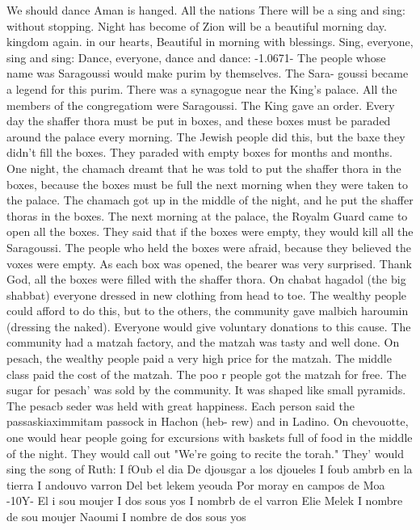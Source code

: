 {{We should dance 
Aman is hanged.
All the nations 
There will be a 
sing and sing: 
without stopping.
Night has become 
of Zion will be a 
beautiful morning 
day.
kingdom again.
in our hearts, 
Beautiful in morning with blessings.
Sing, everyone, sing and sing: 
Dance, everyone, dance and dance: 
-1.0671- 
The people whose name was Saragoussi would make purim by themselves.
The Sara-
goussi became a legend for this purim.
There was a synagogue near the King's palace.
All the members of the congregatiom were Saragoussi.
The King gave an order.
Every 
day the shaffer thora must be put in boxes, and these boxes must be paraded around the 
palace every morning.
The Jewish people did this, but the baxe they didn't fill the 
boxes.
They paraded with empty boxes for months and months.
One night, the chamach dreamt 
that he was told to put the shaffer thora in the boxes, because the boxes must be full 
the next morning when they were taken to the palace.
The chamach got up in the middle of 
the night, and he put the shaffer thoras in the boxes.
The next morning at the palace, the Royalm Guard came to open all the boxes.
They 
said that if the boxes were empty, they would kill all the Saragoussi.
The people who 
held the boxes were afraid, because they believed the voxes were empty.
As each box 
was opened, the bearer was very surprised.
Thank God, all the boxes were filled with the 
shaffer thora.
On chabat hagadol (the big shabbat) everyone dressed in new clothing from head to 
toe.
The wealthy people could afford to do this, but to the others, the community gave 
malbich haroumin (dressing the naked).
Everyone would give voluntary donations to this 
cause.
The community had a matzah factory, and the matzah was tasty and well done.
On 
pesach, the wealthy people paid a very high price for the matzah.
The middle class paid 
the cost of the matzah.
The poo r people got the matzah for free.
The sugar for pesach' 
was sold by the community.
It was shaped like small pyramids.
The pesacb seder was 
held with great happiness.
Each person said the passaskiaximmitam passock in Hachon (heb-
rew) and in Ladino.
On chevouotte, one would hear people going for excursions with baskets full of food 
in the middle of the night.
They would call out "We're going to recite the torah."
They' 
would sing the song of Ruth: 
I fOub el dia 
De djousgar a los djoueles 
I foub ambrb en la tierra 
I andouvo varron 
Del bet lekem yeouda 
Por moray en campos de Moa 
-10Y-
El i sou moujer 
I dos sous yos 
I nombrb de el varron Elie Melek 
I nombre de sou moujer Naoumi 
I nombre de dos sous yos 
}}
